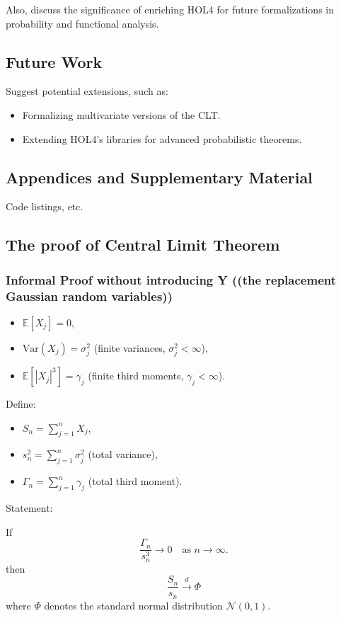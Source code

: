 Also, discuss the significance of enriching HOL4 for future formalizations in probability and functional analysis.

\subsection{Future Work}
Suggest potential extensions, such as:
\begin{itemize}
    \item Formalizing multivariate versions of the CLT.
    \item Extending HOL4’s libraries for advanced probabilistic theorems.
\end{itemize}

\subsection{Appendices and Supplementary Material}
Code listings, etc.

\newpage
\subsection{The proof of Central Limit Theorem}
\subsubsection{Informal Proof without introducing Y ((the replacement Gaussian random variables))}
\begin{itemize}
        \item[] \( \mathbb{E}[X_j] = 0 \), 
        \item[] \( \text{Var}(X_j) = \sigma_j^2 \) (finite variances, \( \sigma_j^2 < \infty \)),
        \item[] \( \mathbb{E}[|X_j|^3] = \gamma_j \) (finite third moments, \( \gamma_j < \infty \)).
    \end{itemize}

Define:
        \begin{itemize}
            \item[] \( S_n = \sum_{j=1}^n X_j \),
            \item[] \( s_n^2 = \sum_{j=1}^n \sigma_j^2 \) (total variance),
            \item[] \( \Gamma_n = \sum_{j=1}^n \gamma_j \) (total third moment).
\end{itemize}

Statement:

    If 
    \[
   \frac{\Gamma_n}{s_n^3} \to 0 \quad \text{as } n \to \infty.
   \]
   then 
   \[
   \frac{S_n}{s_n} \xrightarrow{d} \Phi
   \]
   where \( \Phi\) denotes the standard normal distribution \( \mathcal{N}(0,1) \).


